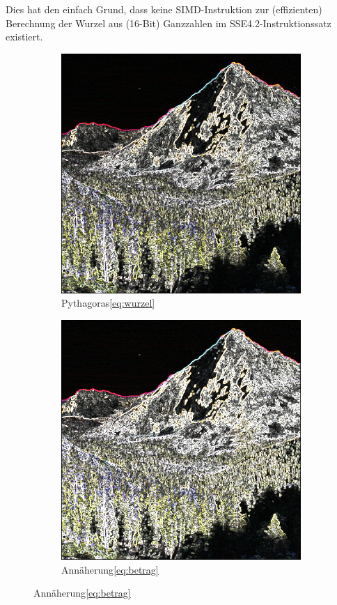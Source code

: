 \documentclass[course=erap]{aspdoc}
\begin{document}
Dies hat den einfach Grund, dass keine SIMD-Instruktion zur (effizienten) Berechnung der Wurzel aus (16-Bit) Ganzzahlen im SSE4.2-Instruktionssatz existiert.
\begin{figure}[H]
    \begin{subfigure}{.5\columnwidth}
        \centering
        \includegraphics[width=\columnwidth]{graphics/sqrt_sobel}
        \caption{Pythagoras\ref{eq:wurzel}}
        \label{fig:sqrt-bild}
    \end{subfigure}
    \begin{subfigure}{.5\columnwidth}
        \centering
        \includegraphics[width=\columnwidth]{graphics/johnmuirtrail_sobel}
        \caption{Annäherung\ref{eq:betrag}}
        \label{fig:abs-bild}
    \end{subfigure}
\end{figure}
\end{document}
